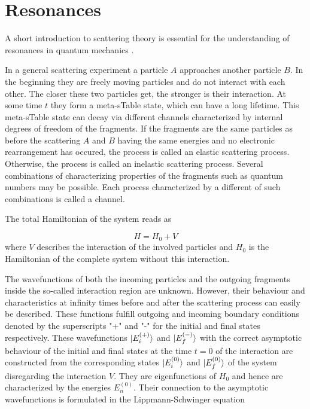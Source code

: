 \chapter{Resonances}

A short introduction to scattering theory is essential for the understanding
of resonances in quantum mechanics \cite{nolting52,Gell-Mann53,Taylor87}.

In a general scattering experiment a particle $A$ approaches another
particle $B$. In the beginning they are freely moving particles and do not interact
with each other. The closer these two particles get, the stronger is their interaction.
At some time $t$ they form a meta-sTable state, which can have a long lifetime.
This meta-sTable state can decay via different channels characterized
by internal degrees of freedom of the fragments. If the fragments are the
same particles as before the scattering $A$ and $B$ having the same
energies and no electronic rearrangement
has occured, the process is called an elastic scattering process.
Otherwise, the process is called an inelastic scattering process.
Several combinations of characterizing properties of the fragments such as
quantum numbers may be possible. Each process characterized by a different
of such combinations is called a channel.

The total Hamiltonian of the system reads as

\begin{equation}
 H = H_0 + V
\end{equation}
where $V$ describes the interaction of the involved particles and
$H_0$ is the Hamiltonian of the complete system without this interaction.

The wavefunctions of both the incoming particles and the outgoing
fragments inside the so-called interaction region are unknown.
However, their behaviour and characteristics at infinity times before
and after the scattering process can easily be described.
These functions fulfill outgoing and incoming boundary conditions
denoted by the superscripts "+" and "-" for the initial and final states
respectively.
These wavefunctions $\ket{E_i^{(+)}}$ and $\ket{E_f^{(-)}}$ with the correct
asymptotic behaviour
of the initial and final states at the time $t=0$ of the interaction
are constructed from the corresponding states $\ket{E_i^{(0)}}$ and
$\ket{E_f^{(0)}}$ of the system disregarding the interaction $V$.
They are eigenfunctions of $H_0$ and hence
are characterized by the energies $E_n^{(0)}$.
Their connection to the asymptotic wavefunctions is
formulated in the Lippmann-Schwinger equation


